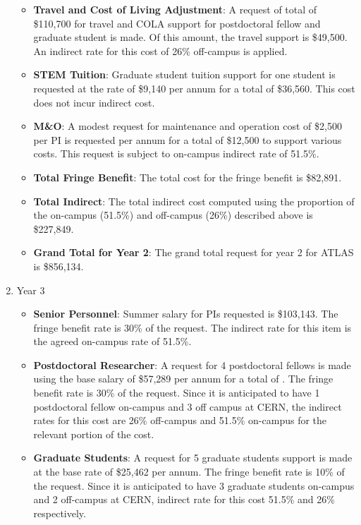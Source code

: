 \begin{enumerate}
\begin{itemize}
\item{{\bf Travel and Cost of Living Adjustment}:  A request of total of \$110,700 for travel and COLA support for postdoctoral fellow and graduate student is made. Of this amount, the travel support is \$49,500.  An indirect rate for this cost of 26\% off-campus is applied. }

\item {{\bf STEM Tuition}: Graduate student tuition support for one student is requested at the rate of \$9,140 per annum for a total of \$36,560.  This cost does not incur indirect cost.}

\item {{\bf M\&O}: A modest request for maintenance and operation cost of \$2,500 per PI is requested per annum for a total of \$12,500 to support various costs. This request is subject to on-campus indirect rate of 51.5\%.}

\item {{\bf Total Fringe Benefit}: The total cost for the fringe benefit is \$82,891.}

\item {{\bf Total Indirect}: The total indirect cost computed using the proportion of the on-campus (51.5\%) and off-campus (26\%) described above is \$227,849.}

\item {{\bf Grand Total for Year 2}: The grand total request for year 2 for ATLAS is \$856,134.}

\end{itemize}

\item{Year 3}
\begin{itemize}
\item{{\bf Senior Personnel}: Summer salary for PIs requested is \$103,143.   The fringe benefit rate is 30\% of the request.  The indirect rate for this item is the agreed on-campus rate of 51.5\%.}

\item {{\bf Postdoctoral Researcher}: A request for 4 postdoctoral fellows is made using the base salary of \$57,289 per annum for a total of .  The fringe benefit rate is 30\% of the request.  Since it is anticipated to have 1 postdoctoral fellow on-campus and 3 off campus at CERN, the indirect rates for this cost are 26\% off-campus and 51.5\% on-campus for the relevant portion of the cost.} 

\item{{\bf Graduate Students}: A request for 5 graduate students support is made at the base rate of \$25,462 per annum.  The fringe benefit rate is 10\% of the request.  Since it is anticipated to have 3 graduate students on-campus and 2 off-campus at CERN, indirect rate for this cost 51.5\% and 26\% respectively.}



\end{itemize}
\end{enumerate}
